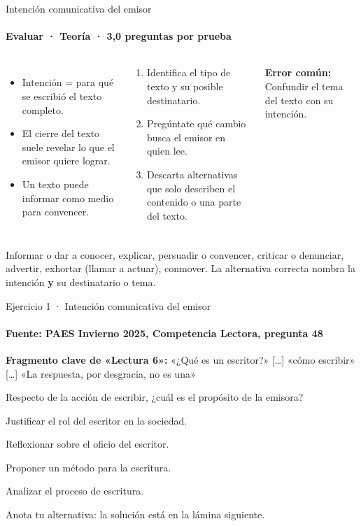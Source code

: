\documentclass[aspectratio=169,11pt]{beamer}
\newcommand{\alternativa}[2]{\begin{opcion}\tecla{#1}\hspace{0.6em}#2\end{opcion}}
\newlength{\ajustealto}
\newenvironment{ajustar}[1][0.74\textheight]
  {\setlength{\ajustealto}{#1}\begin{lrbox}{\ajustecaja}\begin{minipage}{\textwidth}}
  {\end{minipage}\end{lrbox}%
   \ifdim\dimexpr\ht\ajustecaja+\dp\ajustecaja\relax>\ajustealto
     \resizebox*{!}{\ajustealto}{\usebox{\ajustecaja}}\else\usebox{\ajustecaja}\fi}
\begin{document}
\begin{frame}{Intención comunicativa del emisor}
\label{tema-cl-intencion}
\framesubtitle{Evaluar · Teoría · 3,0 preguntas por prueba}
\begin{ajustar}
\begin{columns}[T,onlytextwidth]
\begin{itemize}\footnotesize
\item Intención = para qué se escribió el texto completo.
\item El cierre del texto suele revelar lo que el emisor quiere lograr.
\item Un texto puede informar como medio para convencer.
\end{itemize}
\begin{cajaregla}\scriptsize \begin{enumerate}\item Identifica el tipo de texto y su posible destinatario.\item Pregúntate qué cambio busca el emisor en quien lee.\item Descarta alternativas que solo describen el contenido o una parte del texto.\end{enumerate}\end{cajaregla}
\begin{notagris}\scriptsize \textbf{Error común:} Confundir el tema del texto con su intención.\end{notagris}
\end{columns}
\begin{cajaclave}\footnotesize
Informar o dar a conocer, explicar, persuadir o convencer, criticar o denunciar, advertir, exhortar (llamar a actuar), conmover. La alternativa correcta nombra la intención \textbf{y} su destinatario o tema.
\end{cajaclave}
\end{ajustar}
\end{frame}

\begin{frame}{Ejercicio 1 · Intención comunicativa del emisor}
\framesubtitle{Fuente: PAES Invierno 2025, Competencia Lectora, pregunta 48}
\begin{ajustar}[0.7\textheight]
\begin{notagris}\scriptsize \textbf{Fragmento clave de «Lectura 6»:} «¿Qué es un escritor?» [\ldots] «cómo escribir» [\ldots] «La respuesta, por desgracia, no es una»\end{notagris}
{\small Respecto de la acción de escribir, ¿cuál es el propósito de la emisora?}
\vspace{0.4em}
\alternativa{A}{Justificar el rol del escritor en la sociedad.}
\alternativa{B}{Reflexionar sobre el oficio del escritor.}
\alternativa{C}{Proponer un método para la escritura.}
\alternativa{D}{Analizar el proceso de escritura.}
\end{ajustar}
\vfill{\tiny\color{zinc500}\hfill Anota tu alternativa: la solución está en la lámina siguiente.}
\end{frame}
\end{document}

